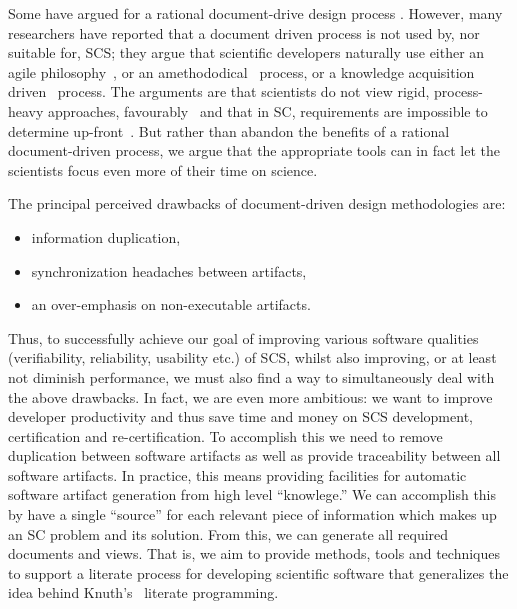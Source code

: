 \documentclass{sig-alternate-05-2015}
\begin{document}
Some have argued for a rational document-drive design process%
\cite{SmithAndKoothoor2016}.  However, many researchers have
reported that a document driven process is not used by, nor suitable for, SCS;
they argue that scientific developers naturally use either an agile
philosophy~\cite{CarverEtAl2007, EasterbrookAndJohns2009, Segal2005}, or an
amethododical~\cite{Kelly2013} process, or a knowledge acquisition
driven~\cite{Kelly2015} process.  The arguments are that scientists do not
view rigid, process-heavy approaches, favourably~\cite{CarverEtAl2007} and that
in SC, requirements are impossible to determine up-front~\cite{CarverEtAl2007,
  SegalAndMorris2008}.  But rather than abandon the benefits of a rational
document-driven process, we argue that the appropriate tools can in fact
let the scientists focus even more of their time on science.

The principal perceived drawbacks of document-driven design methodologies are:
\begin{itemize}
\setlength{\itemsep}{0.0em}
\setlength{\parskip}{0pt}
\setlength{\parsep}{0pt}
\item information duplication,
\item synchronization headaches between artifacts,
\item an over-emphasis on non-executable artifacts.
\end{itemize}

Thus, to successfully achieve our goal of improving various software qualities
(verifiability, reliability, usability etc.) of SCS, whilst also improving,
or at least not diminish performance, we must also find a way to simultaneously
deal with the above drawbacks.  In fact, we are even more ambitious: we want
to improve developer productivity and thus save time and money on SCS development,
certification and re-certification. To accomplish this we need to remove
duplication between software artifacts \cite{WilsonEtAl2013} as well as provide
traceability between all software artifacts. In practice, this means providing
facilities for automatic software artifact generation from high level
``knowlege.'' We can accomplish this by have a single ``source'' for each
relevant piece of information which makes up an SC problem and its solution.
From this, we can generate all required documents and views.
That is, we aim to provide methods, tools and techniques to support a literate
process for developing scientific software that generalizes the idea behind
Knuth's~\cite{Knuth1984} literate programming.
\end{document}
